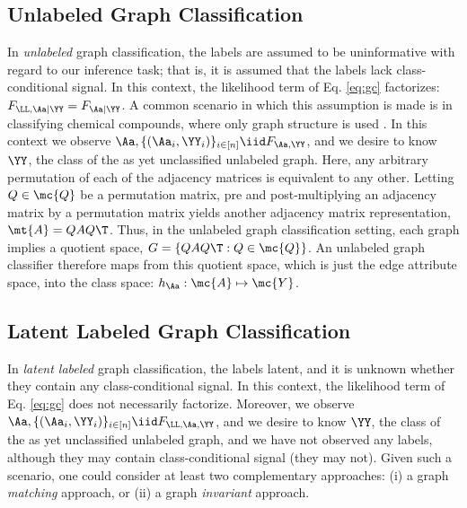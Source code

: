 \documentclass[10pt,journal,cspaper,compsoc]{IEEEtran}
\begin{document}


\subsection{Unlabeled Graph Classification} %
\label{sub:unlabeled_graph_classification}

In \emph{unlabeled} graph classification, the labels are assumed to be uninformative with regard to our inference task; that is, it is assumed that the labels lack class-conditional signal. In this context, the likelihood term of Eq. \eqref{eq:gc} factorizes: $F_{\LL,\Aa|\YY}=F_{\Aa | \YY}$.  A common scenario in which this assumption is made is in classifying chemical compounds, where only graph structure is used \cite{Bunke2011}.  In this context we observe $\Aa, \{(\Aa_i,\YY_i)\}_{i \in [n]} \iid F_{\Aa,\YY}$, and we desire to know $\YY$, the class of the as yet unclassified unlabeled graph.  Here, any arbitrary permutation of each of the adjacency matrices is equivalent to any other.  Letting $Q \in \mc{Q}$ be a permutation matrix, pre and post-multiplying an adjacency matrix by a permutation matrix yields another adjacency matrix representation, $\mt{A}=QAQ\T$.  Thus, in the unlabeled graph classification setting, each graph implies a quotient space,  $G=\{QAQ\T : Q \in \mc{Q}\}$. An unlabeled graph classifier therefore maps from this quotient space, which is just the edge attribute space, into the class space: $h_{\Aa}: \mc{A} \mapsto \mc{Y}$.





\subsection{Latent Labeled Graph Classification} %
\label{sub:latent_labeled_graph_classification}

In \emph{latent labeled} graph classification, the labels latent, and it is unknown whether they contain any class-conditional signal.  In this context, the likelihood term of Eq. \eqref{eq:gc} does not necessarily factorize. Moreover, we observe $\Aa, \{(\Aa_i,\YY_i)\}_{i \in [n]} \iid F_{\LL, \Aa,\YY}$, and we desire to know $\YY$, the class of the as yet unclassified unlabeled graph, and we have not observed any labels, although they may contain class-conditional signal (they may not).  Given such a scenario, one could consider at least two complementary approaches: (i) a graph \emph{matching} approach, or (ii) a graph \emph{invariant} approach.
\end{document}

